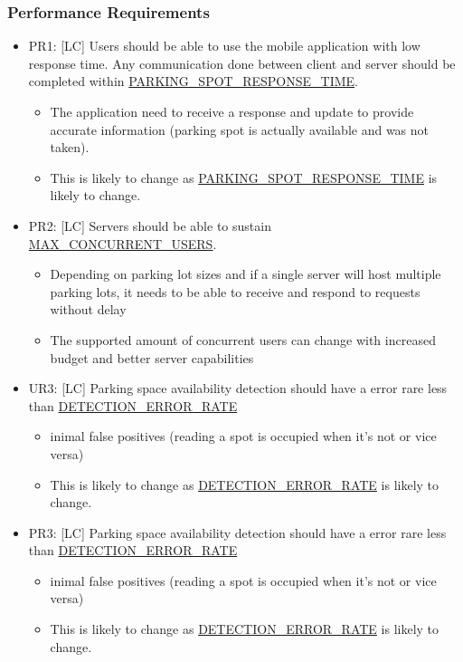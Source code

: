 \documentclass[]{article}
\begin{document}
\subsubsection{Performance Requirements}
\begin{itemize}
	\item PR1: [LC] Users should be able to use the mobile application with low response time. Any communication done between client and server should be completed within \hyperlink{RESPONSETIME}{PARKING\_SPOT\_RESPONSE\_TIME}.
	\begin{itemize}
		\item The application need to receive a response and update to provide accurate information (parking spot is actually available and was not taken).
		\item This is likely to change as \hyperlink{RESPONSETIME}{PARKING\_SPOT\_RESPONSE\_TIME} is likely to change.
	\end{itemize}

	\item PR2: [LC] Servers should be able to sustain \hyperlink{CONCUSERS}{MAX\_CONCURRENT\_USERS}.
	\begin{itemize}
		\item Depending on parking lot sizes and if a single server will host multiple parking lots, it needs to be able to receive and respond to requests without delay
		\item The supported amount of concurrent users can change with increased budget and better server capabilities
	\end{itemize}

	\item UR3: [LC] Parking space availability detection should have a error rare less than \hyperlink{DETERR}{DETECTION\_ERROR\_RATE}
	\begin{itemize}
		\item inimal false positives (reading a spot is occupied when it’s not or vice versa)
		\item This is likely to change as \hyperlink{DETERR}{DETECTION\_ERROR\_RATE} is likely to change.
	\end{itemize}

	\item PR3: [LC] Parking space availability detection should have a error rare less than \hyperlink{DETERR}{DETECTION\_ERROR\_RATE}
	\begin{itemize}
		\item inimal false positives (reading a spot is occupied when it’s not or vice versa)
		\item This is likely to change as \hyperlink{DETERR}{DETECTION\_ERROR\_RATE} is likely to change.
	\end{itemize}
\end{itemize}
\end{document}
